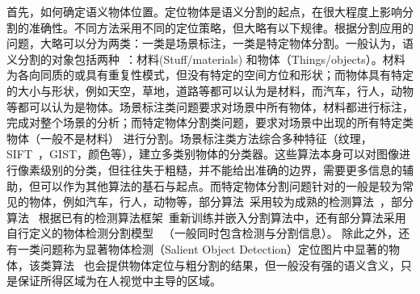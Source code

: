 首先，如何确定语义物体位置。定位物体是语义分割的起点，在很大程度上影响分割的准确性。不同方法采用不同的定位策略，但大略有以下规律。根据分割应用的问题，大略可以分为两类：一类是场景标注，一类是特定物体分割。一般认为，语义分割的对象包括两种~\cite{thingstuff}\cite{forsyth1996finding}：材料(Stuff/materials) 和物体（Things/objects）。材料为各向同质的或具有重复性模式，但没有特定的空间方位和形状；而物体具有特定的大小与形状，例如天空，草地，道路等都可以认为是材料，而汽车，行人，动物等都可以认为是物体。场景标注类问题要求对场景中所有物体，材料都进行标注，完成对整个场景的分析；而特定物体分割类问题，要求对场景中出现的所有特定类物体（一般不是材料） 进行分割。场景标注类方法综合多种特征（纹理，SIFT~\cite{sift}，GIST\cite{gist}，颜色等），建立多类别物体的分类器\cite{textonboost}\cite{stf}\cite{structrf}。这些算法本身可以对图像进行像素级别的分类，但往往失于粗糙，并不能给出准确的边界，需要更多信息的辅助，但可以作为其他算法的基石与起点。而特定物体分割问题针对的一般是较为常见的物体，例如汽车，行人，动物等，部分算法~\cite{whoblockswho}\cite{goodparts}\cite{lvlsetseg}采用较为成熟的检测算法~\cite{vjdetect}\cite{hog}\cite{houghforest}，部分算法~\cite{objcut}\cite{aeembed}\cite{layeredobject} 根据已有的检测算法框架~\cite{dpm}\cite{poselet}\cite{ps}重新训练并嵌入分割算法中，还有部分算法采用自行定义的物体检测分割模型~\cite{shapeguided}\cite{learn2combine}\cite{tdbu}\cite{recursiveseg} （一般同时包含检测与分割信息）。 除此之外，还有一类问题称为显著物体检测（Salient Object Detection）定位图片中显著的物体，该类算法~\cite{salient1}\cite{salient2}\cite{salient3}\cite{salient4} 也会提供物体定位与粗分割的结果，但一般没有强的语义含义，只是保证所得区域为在人视觉中主导的区域。

